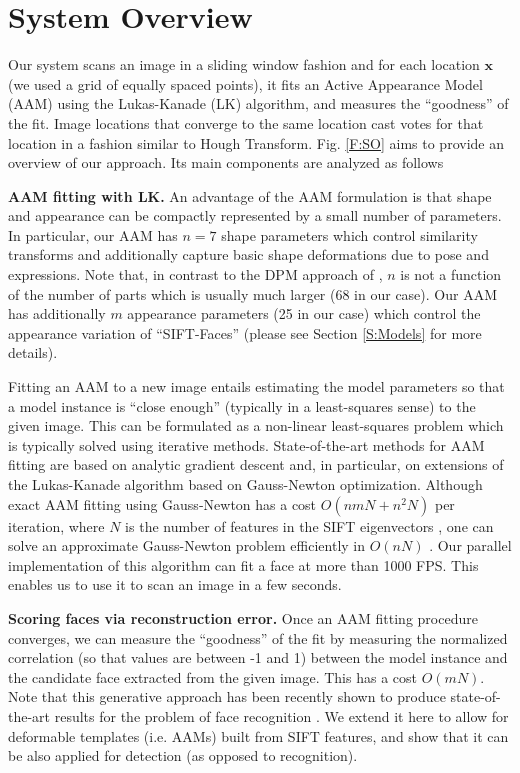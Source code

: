 \documentclass[runningheads]{llncs}
\begin{document}
\section{System Overview} \label{S:Overview}

Our system scans an image in a sliding window fashion and for each location $\mathbf{x}$ (we used a grid of equally spaced points), it fits an Active Appearance Model (AAM) using the Lukas-Kanade (LK) algorithm, and measures the ``goodness'' of the fit. Image locations that converge to the same location cast votes for that location in a fashion similar to Hough Transform. Fig. \ref{F:SO} aims to provide an overview of our approach. Its main components are analyzed as follows

\textbf{AAM fitting with LK.} An advantage of the AAM formulation is that shape and appearance can be compactly represented by a small number of parameters. In particular, our AAM has $n=7$ shape parameters which control similarity transforms and additionally capture basic shape deformations due to pose and expressions. Note that, in contrast to the DPM approach of \cite{ramanan2011}, $n$ is not a function of the number of parts which is usually much larger (68 in our case). Our AAM has additionally $m$ appearance parameters (25 in our case) which control the appearance variation of ``SIFT-Faces'' (please see Section \ref{S:Models} for more details). 

Fitting an AAM to a new image entails estimating the model parameters so that a model instance is ``close enough'' (typically in a least-squares sense) to the given image. This can be formulated as a non-linear least-squares problem which is typically solved using iterative methods. State-of-the-art methods for AAM fitting are based on analytic gradient descent and, in particular, on extensions of the Lukas-Kanade algorithm based on Gauss-Newton optimization. Although exact AAM fitting using Gauss-Newton has a cost $O(nmN + n^2N)$ per iteration, where $N$ is the number of features in the SIFT eigenvectors \cite{tzimiropoulosoptimization}, one can solve an approximate Gauss-Newton problem efficiently in $O(nN)$ \cite{matthews2004active}. Our parallel implementation of this algorithm can fit a face at more than 1000 FPS. This enables us to use it to scan an image in a few seconds.

\textbf{Scoring faces via reconstruction error.} Once an AAM fitting procedure converges, we can measure the ``goodness'' of the fit by measuring the normalized correlation (so that values are between -1 and 1) between the model instance and the candidate face extracted from the given image. This has a cost $O(mN)$. Note that this generative approach has been recently shown to produce state-of-the-art results for the problem of face recognition \cite{naseem2010linear, zhang2011sparse}. We extend it here to allow for deformable templates (i.e. AAMs) built from SIFT features, and show that it can be also applied for detection (as opposed to recognition).
\end{document}
